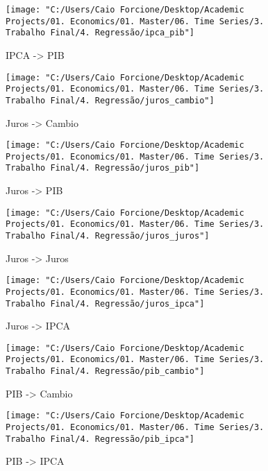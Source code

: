 \documentclass[hidelinks,12pt]{article}
\begin{document}
\begin{figure}[H]
	\centering
	\texttt{[image: "C:/Users/Caio Forcione/Desktop/Academic Projects/01. Economics/01. Master/06. Time Series/3. Trabalho Final/4. Regressão/ipca\_pib"]}
	\caption{IPCA -> PIB}
	\label{fig:ipcapib}
\end{figure}

\begin{figure}[H]
	\centering
	\texttt{[image: "C:/Users/Caio Forcione/Desktop/Academic Projects/01. Economics/01. Master/06. Time Series/3. Trabalho Final/4. Regressão/juros\_cambio"]}
	\caption{Juros -> Cambio}
	\label{fig:juroscambio}
\end{figure}

\begin{figure}[H]
	\centering
	\texttt{[image: "C:/Users/Caio Forcione/Desktop/Academic Projects/01. Economics/01. Master/06. Time Series/3. Trabalho Final/4. Regressão/juros\_pib"]}
	\caption{Juros -> PIB}
	\label{fig:jurospib}
\end{figure}


\begin{figure}[H]
	\centering
	\texttt{[image: "C:/Users/Caio Forcione/Desktop/Academic Projects/01. Economics/01. Master/06. Time Series/3. Trabalho Final/4. Regressão/juros\_juros"]}
	\caption{Juros -> Juros}
	\label{fig:jurosjuros}
\end{figure}


\begin{figure}[H]
	\centering
	\texttt{[image: "C:/Users/Caio Forcione/Desktop/Academic Projects/01. Economics/01. Master/06. Time Series/3. Trabalho Final/4. Regressão/juros\_ipca"]}
	\caption{Juros -> IPCA}
	\label{fig:jurosipca}
\end{figure}


\begin{figure}[H]
	\centering
	\texttt{[image: "C:/Users/Caio Forcione/Desktop/Academic Projects/01. Economics/01. Master/06. Time Series/3. Trabalho Final/4. Regressão/pib\_cambio"]}
	\caption{PIB -> Cambio}
	\label{fig:pibcambio}
\end{figure}



\begin{figure}[H]
	\centering
	\texttt{[image: "C:/Users/Caio Forcione/Desktop/Academic Projects/01. Economics/01. Master/06. Time Series/3. Trabalho Final/4. Regressão/pib\_ipca"]}
	\caption{PIB -> IPCA}
	\label{fig:pibipca}
\end{figure}
\end{document}
